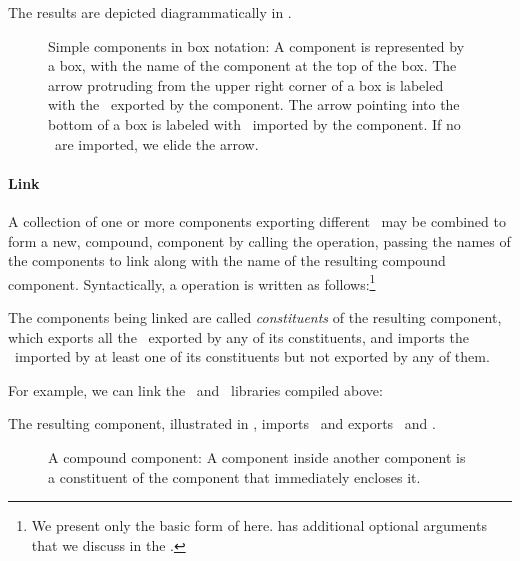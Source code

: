 The results are depicted diagrammatically
in .
\begin{figure}
\begin{center}

\end{center}
\caption{Simple components in box notation:
A component is represented by a box,
with the name of the component at the top of the box.
The arrow protruding from the upper right corner of a box
is labeled with the \apisN\ exported by the component.
The arrow pointing into the bottom of a box
is labeled with \apisN\ imported by the component.
If no \apisN\ are imported, we elide the arrow.}
\end{figure}

\paragraph{Link}

A collection of one or more components exporting different \apisN\
may be combined to form a new, compound, component
by calling the  operation,
passing the names of the components to link
along with the name of the resulting compound component.
Syntactically, a  operation is written as follows:\footnote{We
present only the basic form of  here.
\shellcommand{link} has additional optional arguments
that we discuss in the .}


The components being linked are called \emph{constituents}
of the resulting component,
which exports all the \apisN\ exported by any of its constituents,
and imports the \apisN\ imported by at least one of its constituents
but not exported by any of them.

For example,
we can link the \ironio\ and \ironcryp\ libraries
compiled above:


The resulting component,
illustrated in ,
imports \fortsec\ and exports \fortio\ and \fortcryp.
\begin{figure}
\begin{center}

\end{center}
\caption{A compound component:
A component inside another component
is a constituent of the component that immediately encloses it.}
\figlabel{simplelink}
\end{figure}

